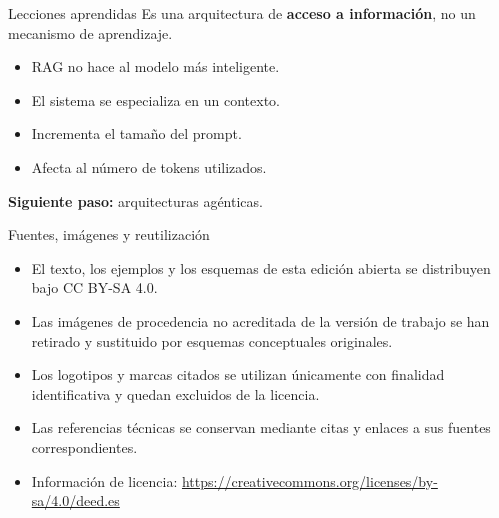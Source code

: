 \documentclass[aspectratio=169]{beamer}
\begin{document}

\begin{frame}{Lecciones aprendidas}
Es una arquitectura de \textbf{acceso a información}, no un mecanismo de aprendizaje.
\vspace{1.5em}
\begin{itemize}
    \item RAG no hace al modelo más inteligente.
    \item El sistema se especializa en un contexto.
    \item Incrementa el tamaño del prompt.
    \item Afecta al número de tokens utilizados.
\end{itemize}
\vspace{1.5em}
\textbf{Siguiente paso:} arquitecturas agénticas.
\end{frame}



\begin{frame}{Fuentes, imágenes y reutilización}
\small
\begin{itemize}
  \item El texto, los ejemplos y los esquemas de esta edición abierta se distribuyen bajo CC BY-SA 4.0.
  \item Las imágenes de procedencia no acreditada de la versión de trabajo se han retirado y sustituido por esquemas conceptuales originales.
  \item Los logotipos y marcas citados se utilizan únicamente con finalidad identificativa y quedan excluidos de la licencia.
  \item Las referencias técnicas se conservan mediante citas y enlaces a sus fuentes correspondientes.
  \item Información de licencia: \url{https://creativecommons.org/licenses/by-sa/4.0/deed.es}
\end{itemize}
\end{frame}
\end{document}
